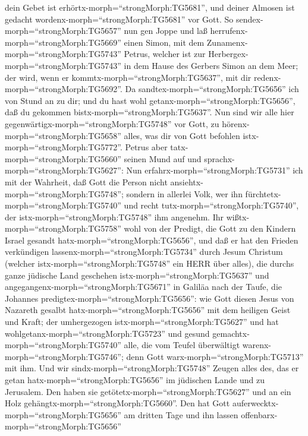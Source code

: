 dein Gebet ist erhörtx-morph=``strongMorph:TG5681'', und deiner Almosen
ist gedacht wordenx-morph=``strongMorph:TG5681'' vor Gott. 
So sendex-morph=``strongMorph:TG5657'' nun gen Joppe und laß
herrufenx-morph=``strongMorph:TG5669'' einen Simon, mit dem
Zunamenx-morph=``strongMorph:TG5743'' Petrus, welcher ist zur
Herbergex-morph=``strongMorph:TG5743'' in dem Hause des Gerbers Simon an
dem Meer; der wird, wenn er kommtx-morph=``strongMorph:TG5637'', mit dir
redenx-morph=``strongMorph:TG5692''.  Da
sandtex-morph=``strongMorph:TG5656'' ich von Stund an zu dir; und du
hast wohl getanx-morph=``strongMorph:TG5656'', daß du gekommen
bistx-morph=``strongMorph:TG5637''. Nun sind wir alle hier
gegenwärtigx-morph=``strongMorph:TG5748'' vor Gott, zu
hörenx-morph=``strongMorph:TG5658'' alles, was dir von Gott befohlen
istx-morph=``strongMorph:TG5772''.  Petrus aber
tatx-morph=``strongMorph:TG5660'' seinen Mund auf und
sprachx-morph=``strongMorph:TG5627'': Nun
erfahrx-morph=``strongMorph:TG5731'' ich mit der Wahrheit, daß Gott die
Person nicht ansiehtx-morph=``strongMorph:TG5748''; 
sondern in allerlei Volk, wer ihn fürchtetx-morph=``strongMorph:TG5740''
und recht tutx-morph=``strongMorph:TG5740'', der
istx-morph=``strongMorph:TG5748'' ihm angenehm.  Ihr
wißtx-morph=``strongMorph:TG5758'' wohl von der Predigt, die Gott zu den
Kindern Israel gesandt hatx-morph=``strongMorph:TG5656'', und daß er hat
den Frieden verkündigen lassenx-morph=``strongMorph:TG5734'' durch Jesum
Christum (welcher istx-morph=``strongMorph:TG5748'' ein HERR über
alles),  die durchs ganze jüdische Land geschehen
istx-morph=``strongMorph:TG5637'' und
angegangenx-morph=``strongMorph:TG5671'' in Galiläa nach der Taufe, die
Johannes predigtex-morph=``strongMorph:TG5656'':  wie Gott
diesen Jesus von Nazareth gesalbt hatx-morph=``strongMorph:TG5656'' mit
dem heiligen Geist und Kraft; der umhergezogen
istx-morph=``strongMorph:TG5627'' und hat
wohlgetanx-morph=``strongMorph:TG5723'' und gesund
gemachtx-morph=``strongMorph:TG5740'' alle, die vom Teufel überwältigt
warenx-morph=``strongMorph:TG5746''; denn Gott
warx-morph=``strongMorph:TG5713'' mit ihm.  Und wir
sindx-morph=``strongMorph:TG5748'' Zeugen alles des, das er getan
hatx-morph=``strongMorph:TG5656'' im jüdischen Lande und zu Jerusalem.
Den haben sie getötetx-morph=``strongMorph:TG5627'' und an ein Holz
gehängtx-morph=``strongMorph:TG5660''.  Den hat Gott
auferwecktx-morph=``strongMorph:TG5656'' am dritten Tage und ihn lassen
offenbarx-morph=``strongMorph:TG5656''
